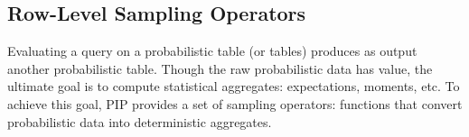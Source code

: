 %
%
%


\subsection{Row-Level Sampling Operators}
Evaluating a query on a probabilistic table (or tables) produces as output another probabilistic table.  Though the raw probabilistic data has value, the ultimate goal is to compute statistical aggregates: expectations, moments, etc.  To achieve this goal, PIP provides a set of sampling operators: functions that convert probabilistic data into deterministic aggregates.  

